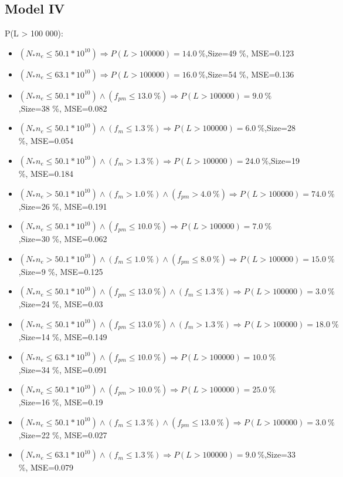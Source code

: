 \documentclass[numbered]{CSL}
\begin{document}
\subsection{Model IV}
P(L > 100 000):
\begin{itemize}
\item $(N_* n_e \leq 50.1 * 10^{10}) \Rightarrow P(L > 100 000) = 14.0~\%$,\hfill Size=49 \%, MSE=0.123
\item $(N_* n_e \leq 63.1 * 10^{10}) \Rightarrow P(L > 100 000) = 16.0~\%$,\hfill Size=54 \%, MSE=0.136
\item $(N_* n_e \leq 50.1 * 10^{10}) \land (f_{pm} \leq 13.0~\%) \Rightarrow P(L > 100 000) = 9.0~\%$,\hfill Size=38 \%, MSE=0.082
\item $(N_* n_e \leq 50.1 * 10^{10}) \land (f_m \leq 1.3~\%) \Rightarrow P(L > 100 000) = 6.0~\%$,\hfill Size=28 \%, MSE=0.054
\item $(N_* n_e \leq 50.1 * 10^{10}) \land (f_m > 1.3~\%) \Rightarrow P(L > 100 000) = 24.0~\%$,\hfill Size=19 \%, MSE=0.184
\item $(N_* n_e > 50.1 * 10^{10}) \land (f_m > 1.0~\%) \land (f_{pm} > 4.0~\%) \Rightarrow P(L > 100 000) = 74.0~\%$,\hfill Size=26 \%, MSE=0.191
\item $(N_* n_e \leq 50.1 * 10^{10}) \land (f_{pm} \leq 10.0~\%) \Rightarrow P(L > 100 000) = 7.0~\%$,\hfill Size=30 \%, MSE=0.062
\item $(N_* n_e > 50.1 * 10^{10}) \land (f_m \leq 1.0~\%) \land (f_{pm} \leq 8.0~\%) \Rightarrow P(L > 100 000) = 15.0~\%$,\hfill Size=9 \%, MSE=0.125
\item $(N_* n_e \leq 50.1 * 10^{10}) \land (f_{pm} \leq 13.0~\%) \land (f_m \leq 1.3~\%) \Rightarrow P(L > 100 000) = 3.0~\%$,\hfill Size=24 \%, MSE=0.03
\item $(N_* n_e \leq 50.1 * 10^{10}) \land (f_{pm} \leq 13.0~\%) \land (f_m > 1.3~\%) \Rightarrow P(L > 100 000) = 18.0~\%$,\hfill Size=14 \%, MSE=0.149
\item $(N_* n_e \leq 63.1 * 10^{10}) \land (f_{pm} \leq 10.0~\%) \Rightarrow P(L > 100 000) = 10.0~\%$,\hfill Size=34 \%, MSE=0.091
\item $(N_* n_e \leq 50.1 * 10^{10}) \land (f_{pm} > 10.0~\%) \Rightarrow P(L > 100 000) = 25.0~\%$,\hfill Size=16 \%, MSE=0.19
\item $(N_* n_e \leq 50.1 * 10^{10}) \land (f_m \leq 1.3~\%) \land (f_{pm} \leq 13.0~\%) \Rightarrow P(L > 100 000) = 3.0~\%$,\hfill Size=22 \%, MSE=0.027
\item $(N_* n_e \leq 63.1 * 10^{10}) \land (f_m \leq 1.3~\%) \Rightarrow P(L > 100 000) = 9.0~\%$,\hfill Size=33 \%, MSE=0.079

\end{itemize}
\end{document}
